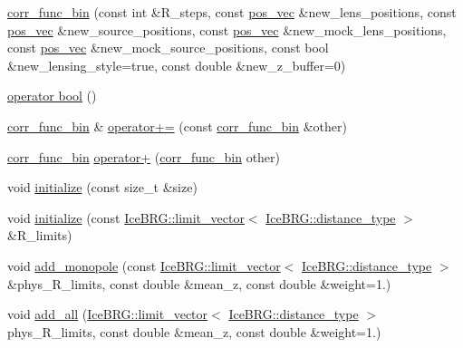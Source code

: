 \begin{DoxyCompactItemize}
\item 
\hyperlink{structcorr__func__bin_ac4625f1ff7e13e360836611e64a8f22a}{corr\-\_\-func\-\_\-bin} (const int \&R\-\_\-steps, const \hyperlink{structcorr__func__bin_a683c7075740b3dcae9ebb1ac758c0bfa}{pos\-\_\-vec} \&new\-\_\-lens\-\_\-positions, const \hyperlink{structcorr__func__bin_a683c7075740b3dcae9ebb1ac758c0bfa}{pos\-\_\-vec} \&new\-\_\-source\-\_\-positions, const \hyperlink{structcorr__func__bin_a683c7075740b3dcae9ebb1ac758c0bfa}{pos\-\_\-vec} \&new\-\_\-mock\-\_\-lens\-\_\-positions, const \hyperlink{structcorr__func__bin_a683c7075740b3dcae9ebb1ac758c0bfa}{pos\-\_\-vec} \&new\-\_\-mock\-\_\-source\-\_\-positions, const bool \&new\-\_\-lensing\-\_\-style=true, const double \&new\-\_\-z\-\_\-buffer=0)
\item 
\hyperlink{structcorr__func__bin_abe404510805b11498212bd1268daa2ed}{operator bool} ()
\item 
\hyperlink{structcorr__func__bin}{corr\-\_\-func\-\_\-bin} \& \hyperlink{structcorr__func__bin_a9f617c1efaa70492e2abffcf940b6353}{operator+=} (const \hyperlink{structcorr__func__bin}{corr\-\_\-func\-\_\-bin} \&other)
\item 
\hyperlink{structcorr__func__bin}{corr\-\_\-func\-\_\-bin} \hyperlink{structcorr__func__bin_a6684a7372d074c139864d2c0891f769e}{operator+} (\hyperlink{structcorr__func__bin}{corr\-\_\-func\-\_\-bin} other)
\item 
void \hyperlink{structcorr__func__bin_a8ee2dfe994831ccd565d2afaf6559d1c}{initialize} (const size\-\_\-t \&size)
\item 
void \hyperlink{structcorr__func__bin_acee1fef21f10e33c8ca6c374982eb313}{initialize} (const \hyperlink{classIceBRG_1_1limit__vector}{Ice\-B\-R\-G\-::limit\-\_\-vector}$<$ \hyperlink{namespaceIceBRG_a45499647eb87e24c10ab32c628711cec}{Ice\-B\-R\-G\-::distance\-\_\-type} $>$ \&R\-\_\-limits)
\item 
void \hyperlink{structcorr__func__bin_a1f64500034d0f8e227cf1e96c2bfed14}{add\-\_\-monopole} (const \hyperlink{classIceBRG_1_1limit__vector}{Ice\-B\-R\-G\-::limit\-\_\-vector}$<$ \hyperlink{namespaceIceBRG_a45499647eb87e24c10ab32c628711cec}{Ice\-B\-R\-G\-::distance\-\_\-type} $>$ \&phys\-\_\-\-R\-\_\-limits, const double \&mean\-\_\-z, const double \&weight=1.)
\item 
void \hyperlink{structcorr__func__bin_a888e1a946ff971f9ccf60a7d7e3aa2af}{add\-\_\-all} (\hyperlink{classIceBRG_1_1limit__vector}{Ice\-B\-R\-G\-::limit\-\_\-vector}$<$ \hyperlink{namespaceIceBRG_a45499647eb87e24c10ab32c628711cec}{Ice\-B\-R\-G\-::distance\-\_\-type} $>$ phys\-\_\-\-R\-\_\-limits, const double \&mean\-\_\-z, const double \&weight=1.)

\end{DoxyCompactItemize}

